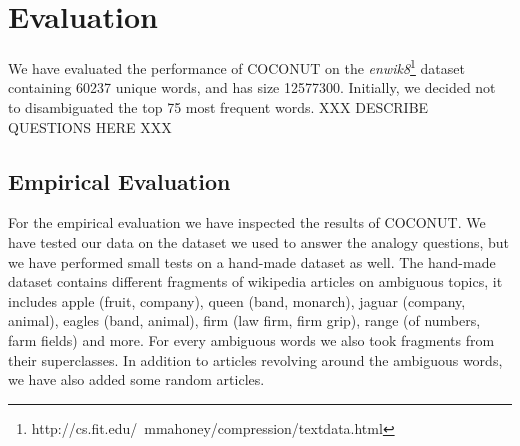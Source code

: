 \documentclass[11pt]{article}
\begin{document}
\section{Evaluation}
We have evaluated the performance of COCONUT on the \textit{enwik8}\footnote{http://cs.fit.edu/~mmahoney/compression/textdata.html} dataset containing 60237 unique words, and has size 12577300. Initially, we decided not to disambiguated the top 75 most frequent words.
XXX DESCRIBE QUESTIONS HERE XXX
\subsection{Empirical Evaluation}
For the empirical evaluation we have inspected the results of COCONUT. We have tested our data on the dataset we used to answer the analogy questions, but we have performed small tests on a hand-made dataset as well. The hand-made dataset contains different fragments of wikipedia articles on ambiguous topics, it includes apple (fruit, company), queen (band, monarch), jaguar (company, animal), eagles (band, animal), firm (law firm, firm grip), range (of numbers, farm fields) and more. For every ambiguous words we also took fragments from their superclasses. In addition to articles revolving around the ambiguous words, we have also added some random articles.
\end{document}
